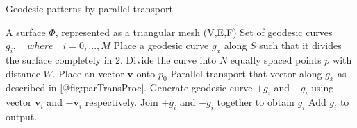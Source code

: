 \begin{algorithm}[H]
\label{parTransPatterns}
\caption{Geodesic patterns by parallel transport}
\renewcommand{\algorithmicrequire}{\textbf{Input:}}
\renewcommand{\algorithmicensure}{\textbf{Output:}}
\scriptsize
\begin{algorithmic}[1]
\REQUIRE A surface $\Phi$, represented as a triangular mesh (V,E,F)
\ENSURE Set of geodesic curves $g_i,\quad where \quad i=0,...,M$
\STATE Place a geodesic curve $g_x$ along $S$ such that it divides the surface completely in 2.
\STATE Divide the curve into $N$ equally spaced points $p$ with distance $W$.
\STATE Place an vector $\mathbf v$  onto $p_0$
\STATE Parallel transport that vector along $g_x$ as described in [@fig:parTransProc].
  \STATE Generate geodesic curve $+g_i$ and $-g_i$ using vector $\mathbf{v}_i$ and $\mathbf{-v}_i$ respectively.
  \STATE Join $+g_i$ and $-g_i$ together to obtain $g_i$
  \STATE Add $g_i$ to output.
\ENDFOR
\end{algorithmic}
\end{algorithm}